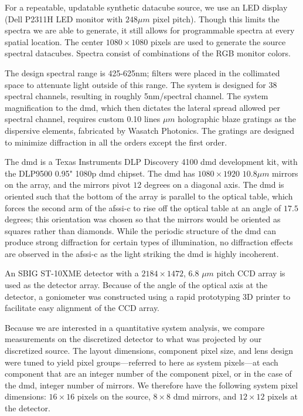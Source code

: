 For a repeatable, updatable synthetic datacube source, we use an LED display (Dell P2311H LED monitor with $248  \mu m $ pixel pitch). Though this limits the spectra we are able to generate, it still allows for programmable spectra at every spatial location. The center $1080\times 1080$ pixels are used to generate the source spectral datacubes. Spectra consist of combinations of the RGB monitor colors.

The design spectral range is 425-625nm; filters were placed in the collimated space to attenuate light outside of this range. The system is designed for 38 spectral channels, resulting in roughly 5nm/spectral channel. The system magnification to the \gls{dmd}, which then dictates the lateral spread allowed per spectral channel, requires custom 0.10 lines $\mu m$ holographic blaze gratings as the dispersive elements, fabricated by Wasatch Photonics. The gratings are designed to minimize diffraction in all the orders except the first order. 

The \gls{dmd} is a Texas Instruments DLP Discovery 4100 \gls{dmd} development kit, with the DLP9500 0.95" 1080p \gls{dmd} chipset. The \gls{dmd} has $1080\times 1920$ $10.8 \mu m $ mirrors on the array, and the mirrors pivot $ 12 $ degrees on a diagonal axis. The \gls{dmd} is oriented such that the bottom of the array is parallel to the optical table, which forces the second arm of the \gls{afssi-c} to rise off the optical table at an angle of $17.5 $ degrees; this orientation was chosen so that the mirrors would be oriented as squares rather than diamonds. While the periodic structure of the \gls{dmd} can produce strong diffraction for certain types of illumination, no diffraction effects are observed in the \gls{afssi-c} as the light striking the \gls{dmd} is highly incoherent. 

An SBIG ST-10XME detector with a $2184 \times 1472$, 6.8 $ \mu m $ pitch CCD array is used as the detector array. Because of the angle of the optical axis at the detector, a goniometer was constructed using a rapid prototyping 3D printer to facilitate easy alignment of the CCD array.

Because we are interested in a quantitative system analysis, we compare measurements on the discretized detector to what was projected by our discretized source. The layout dimensions, component pixel size, and lens design were tuned to yield pixel groups---referred to here as system pixels---at each component that are an integer number of the component pixel, or in the case of the \gls{dmd}, integer number of mirrors. We therefore have the following system pixel dimensions: $16 \times 16$ pixels on the source, $8 \times 8$ \gls{dmd} mirrors, and $12 \times 12$ pixels at the detector.

